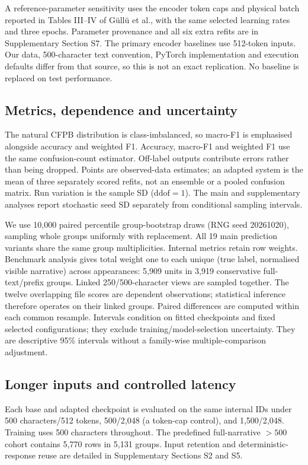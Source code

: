 \documentclass{elektr}
\begin{document}
A reference-parameter sensitivity uses the encoder token caps and physical batch reported in Tables III--IV of G\"ull\"u et al., with the same selected learning rates and three epochs. Parameter provenance and all six extra refits are in Supplementary Section S7. The primary encoder baselines use 512-token inputs. Our data, 500-character text convention, PyTorch implementation and execution defaults differ from that source, so this is not an exact replication. No baseline is replaced on test performance.

\subsection{Metrics, dependence and uncertainty}
\label{sec:statistics}
The natural CFPB distribution is class-imbalanced, so macro-F1 is emphasised alongside accuracy and weighted F1. Accuracy, macro-F1 and weighted F1 use the same confusion-count estimator. Off-label outputs contribute errors rather than being dropped. Points are observed-data estimates; an adapted system is the mean of three separately scored refits, not an ensemble or a pooled confusion matrix. Run variation is the sample SD ($\mathrm{ddof}=1$). The main and supplementary analyses report stochastic seed SD separately from conditional sampling intervals.

We use 10,000 paired percentile group-bootstrap draws (RNG seed 20261020), sampling whole groups uniformly with replacement. All 19 main prediction variants share the same group multiplicities. Internal metrics retain row weights. Benchmark analysis gives total weight one to each unique (true label, normalised visible narrative) across appearances: 5,909 units in 3,919 conservative full-text/prefix groups. Linked 250/500-character views are sampled together. The twelve overlapping file scores are dependent observations; statistical inference therefore operates on their linked groups. Paired differences are computed within each common resample. Intervals condition on fitted checkpoints and fixed selected configurations; they exclude training/model-selection uncertainty. They are descriptive 95\% intervals without a family-wise multiple-comparison adjustment.

\subsection{Longer inputs and controlled latency}
\label{sec:length-latency}
Each base and adapted checkpoint is evaluated on the same internal IDs under 500 characters/512 tokens, 500/2,048 (a token-cap control), and 1,500/2,048. Training uses 500 characters throughout. The predefined full-narrative $>500$ cohort contains 5,770 rows in 5,131 groups. Input retention and deterministic-response reuse are detailed in Supplementary Sections S2 and S5.
\end{document}
